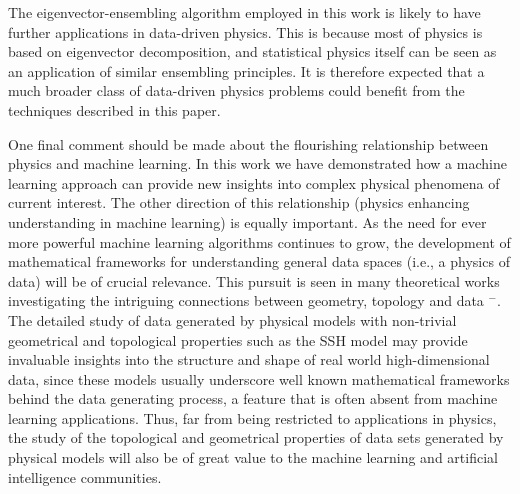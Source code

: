 \documentclass[fleqn,10pt]{wlscirep}
\begin{document}
The eigenvector-ensembling algorithm employed in this work is likely to have further applications in data-driven physics. This is because most of physics is based on eigenvector decomposition, and statistical physics itself can be seen as an application of similar ensembling principles. It is therefore expected that a much broader class of data-driven physics problems could benefit from the techniques described in this paper.

One final comment should be made about the flourishing relationship between physics and machine learning. In this work we have demonstrated how a machine learning approach can provide new insights into complex physical phenomena of current interest. The other direction of this relationship (physics enhancing understanding in machine learning) is equally important. As the need for ever more powerful machine learning algorithms continues to grow, the development of mathematical frameworks for understanding general data spaces (i.e., a physics of data) will be of crucial relevance. This pursuit is seen in many theoretical works investigating the intriguing connections between geometry, topology and data \cite{carlsson2009topology}$^-$\cite{belkin2003problems}. The detailed study of data generated by physical models with non-trivial geometrical and topological properties such as the SSH model may provide invaluable insights into the structure and shape of real world high-dimensional data, since these models usually underscore well known mathematical frameworks behind the data generating process, a feature that is often absent from machine learning applications. Thus, far from being restricted to applications in physics, the study of the topological and geometrical properties of data sets generated by physical models will also be of great value to the machine learning and artificial intelligence communities.  
\end{document}
